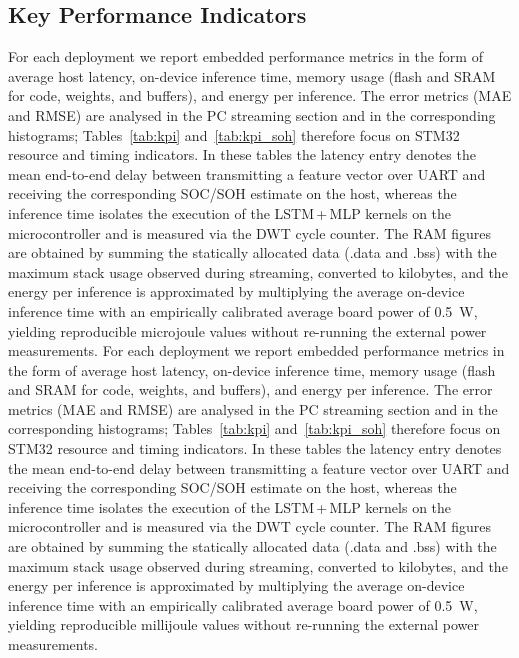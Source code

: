 \documentclass[review]{elsarticle}
\begin{document}
\subsection{Key Performance Indicators}
For each deployment we report embedded performance metrics in the form of average host latency, on-device inference time, memory usage (flash and SRAM for code, weights, and buffers), and energy per inference. The error metrics (MAE and RMSE) are analysed in the PC streaming section and in the corresponding histograms; Tables~\ref{tab:kpi} and~\ref{tab:kpi_soh} therefore focus on STM32 resource and timing indicators. In these tables the latency entry denotes the mean end-to-end delay between transmitting a feature vector over UART and receiving the corresponding SOC/SOH estimate on the host, whereas the inference time isolates the execution of the LSTM\,+\,MLP kernels on the microcontroller and is measured via the DWT cycle counter. The RAM figures are obtained by summing the statically allocated data (.data and .bss) with the maximum stack usage observed during streaming, converted to kilobytes, and the energy per inference is approximated by multiplying the average on-device inference time with an empirically calibrated average board power of \SI{0.5}{\watt}, yielding reproducible microjoule values without re-running the external power measurements.
For each deployment we report embedded performance metrics in the form of average host latency, on-device inference time, memory usage (flash and SRAM for code, weights, and buffers), and energy per inference. The error metrics (MAE and RMSE) are analysed in the PC streaming section and in the corresponding histograms; Tables~\ref{tab:kpi} and~\ref{tab:kpi_soh} therefore focus on STM32 resource and timing indicators. In these tables the latency entry denotes the mean end-to-end delay between transmitting a feature vector over UART and receiving the corresponding SOC/SOH estimate on the host, whereas the inference time isolates the execution of the LSTM\,+\,MLP kernels on the microcontroller and is measured via the DWT cycle counter. The RAM figures are obtained by summing the statically allocated data (.data and .bss) with the maximum stack usage observed during streaming, converted to kilobytes, and the energy per inference is approximated by multiplying the average on-device inference time with an empirically calibrated average board power of \SI{0.5}{\watt}, yielding reproducible millijoule values without re-running the external power measurements.
\end{document}
